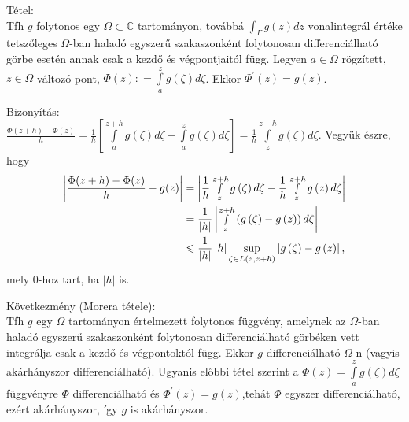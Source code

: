\documentclass[12pt,a4paper]{scrartcl}
\newenvironment{tetel}{}{}
\newenvironment{bizonyitas}{}{}
\begin{document}
\begin{tetel}

Tétel:\\
Tfh \(g\) folytonos egy \(\Omega \subset {\mathbb{C}}\) tartományon,
továbbá \(\int_{\Gamma}{g\left( z \right)dz}\) vonalintegrál értéke
tetszőleges \(\Omega\)-ban haladó egyszerű szakaszonként folytonosan
differenciálható görbe esetén annak csak a kezdő és végpontjaitól függ.
Legyen \(a \in \Omega\) rögzített, \(z \in \Omega\) változó pont,
\(\Phi\left( z \right): = {\int\limits_{a}^{z}{g\left( \zeta \right)d\zeta}}\).
Ekkor \(\Phi^{\prime}\left( z \right) = g\left( z \right)\).

\end{tetel}

\begin{bizonyitas}

Bizonyítás:\\
\(\frac{\Phi\left( {z + h} \right) - \Phi\left( z \right)}{h} = \frac{1}{h}\left\lbrack {{\int\limits_{a}^{z + h}{g\left( \zeta \right)d\zeta}} - {\int\limits_{a}^{z}{g\left( \zeta \right)d\zeta}}} \right\rbrack = \frac{1}{h}{\int\limits_{z}^{z + h}{g\left( \zeta \right)d\zeta}}\).
Vegyük észre, hogy \[\begin{aligned}
  \left| {\frac{{\Phi (z + h) - \Phi (z)}}{h} - g(z)} \right| &  = \left| {\frac{1}{h}\mathop \smallint \limits_z^{z + h} g\left( \zeta  \right)d\zeta  - \frac{1}{h}\mathop \smallint \limits_z^{z + h} g\left( z \right)d\zeta } \right| \\ 
   &  = \frac{1}{{\left| h \right|}}\left| {\mathop \smallint \limits_z^{z + h} \left( {g\left( \zeta  \right) - g\left( z \right)} \right)d\zeta } \right| \\ 
   &  \leqslant \frac{1}{{\left| h \right|}}\left| h \right|\mathop {\sup }\limits_{\zeta  \in L\left( {z,z + h} \right)} \left| {g\left( \zeta  \right) - g\left( z \right)} \right|, \\ 
\end{aligned} \] mely 0-hoz tart, ha \(\left| h \right|\) is.

\end{bizonyitas}

\begin{tetel}

Következmény (Morera tétele):\\
Tfh \(g\) egy \(\Omega\) tartományon értelmezett folytonos függvény,
amelynek az \(\Omega\)-ban haladó egyszerű szakaszonként folytonosan
differenciálható görbéken vett integrálja csak a kezdő és végpontoktól
függ. Ekkor \(g\) differenciálható \(\Omega\)-n (vagyis akárhányszor
differenciálható). Ugyanis előbbi tétel szerint a
\(\Phi\left( z \right) = {\int\limits_{a}^{z}{g\left( \zeta \right)d\zeta}}\)
függvényre \(\Phi\) differenciálható és
\(\Phi^{\prime}\left( z \right) = g\left( z \right)\),tehát \(\Phi\)
egyszer differenciálható, ezért akárhányszor, így \(g\) is akárhányszor.

\end{tetel}
\end{document}
